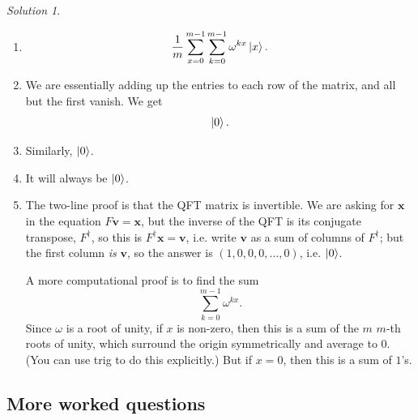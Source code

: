 \documentclass{article}
\theoremstyle{plain}
\theoremstyle{definition}
\theoremstyle{remark}
\newtheorem*{solution}{Solution}
\numberwithin{theorem}{section}
\begin{document}
\begin{enumerate}
		\begin{solution}

		\begin{enumerate}
			\item \[
					\frac{1}{m} \sum_{x=0}^{m-1} \sum_{k=0}^{m-1} \omega^{kx} \ket{x}.
				\]
			\item We are essentially adding up the entries to each row of the matrix, and all but the first vanish.  We get
				\[
					\ket{0}.
				\]
			\item Similarly, $\ket{0}$.
			\item It will always be $\ket{0}$.
			\item The two-line proof is that the QFT matrix is invertible.  We are asking for $\mathbf{x}$ in the equation $F\mathbf{v} = \mathbf{x}$, but the inverse of the QFT is its conjugate transpose, $F^\dagger$, so this is $F^{\dagger} \mathbf{x} = \mathbf{v}$, i.e. write $\mathbf{v}$ as a sum of columns of $F^{\dagger}$; but the first column \emph{is} $\mathbf{v}$, so the answer is $(1,0,0,0,\ldots,0)$, i.e. $\ket{0}$.

				A more computational proof is to find the sum
				\[
					\sum_{k=0}^{m-1} \omega^{kx}.
				\]
				Since $\omega$ is a root of unity, if $x$ is non-zero, then this is a sum of the $m$ $m$-th roots of unity, which surround the origin symmetrically and average to $0$.  (You can use trig to do this explicitly.)  But if $x=0$, then this is a sum of $1$'s.
		\end{enumerate}
		\end{solution}

  \end{enumerate}

   \subsection{More worked questions}
\end{document}
